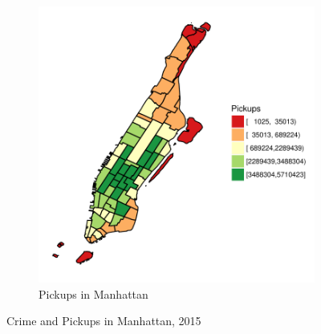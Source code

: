 \documentclass{sigkddExp}
\begin{document}
\begin{figure}
\begin{subfigure}[t]{0.5\textwidth}
        \includegraphics[width=.9\textwidth]{../img/taxis_2015_Manhattan}
        \caption{Pickups in Manhattan}
    \end{subfigure}
    \caption{Crime and Pickups in Manhattan, 2015}
    \label{Manhattan}
  \end{figure}
\end{document}

